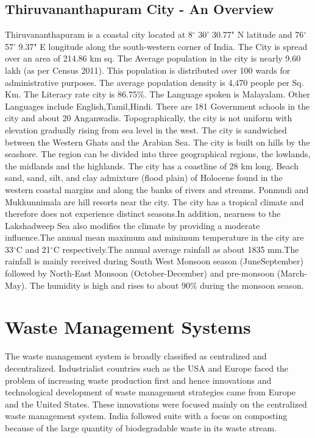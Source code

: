 \documentclass[12pt,a4paper]{  report}
\begin{document}
\section{Thiruvananthapuram City - An Overview}
\begin{justify}
	Thiruvananthapuram is a coastal city located at 8$^\circ$ 30' 30.77" N latitude and 76$^\circ$ 57' 9.37" E longitude along the south-western corner of India. The City is spread over an area of 214.86 km sq. The Average population in the city is nearly 9.60 lakh (as per Census 2011). This population is distributed over 100 wards for administrative purposes. The average population density is 4,470 people per Sq. Km. The Literacy rate city is 86.75\%. The Language spoken is Malayalam. Other Languages include English,Tamil,Hindi. There are 181 Government schools in the city and about 20 Anganwadis.	
	Topographically, the city is not uniform with elevation gradually rising from sea level in the west. The city is sandwiched between the Western Ghats and the Arabian Sea. The city is built on hills by the seashore. The region can be divided into three geographical regions, the lowlands, the midlands and the highlands. The city has a coastline of 28 km long. Beach sand, sand, silt, and clay admixture (flood plain) of Holocene found in the western coastal margins and along the banks of rivers and streams. Ponmudi and Mukkunnimala are hill resorts near the city.
	The city has a tropical climate and therefore does not experience distinct seasons.In addition, nearness to the Lakshadweep Sea also modifies the climate by providing a moderate influence.The annual mean maximum and minimum temperature in the city are 33$^\circ$C and 21$^\circ$C respectively.The annual average rainfall as about 1835 mm.The rainfall is mainly received during South West Monsoon season (JuneSeptember) followed by North-East Monsoon (October-December) and pre-monsoon (March-May). The humidity is high and rises to about 90\% during the monsoon season.
\end{justify}	
\chapter{\textbf{Waste Management Systems}}
\begin{justify}
	The waste management system is broadly classified as centralized and decentralized. Industrialist countries such as the USA and Europe faced the problem of increasing waste production first and hence innovations and technological development of waste management strategies came from Europe and the United States. These innovations were focused mainly on the centralized waste management system. India followed suite with a focus on composting because of the large quantity of biodegradable waste in its waste stream.
\end{justify}
\end{document}
